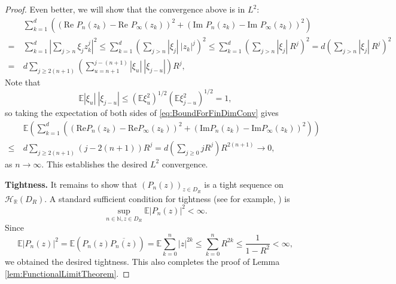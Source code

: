 \documentclass[12pt, reqno]{amsart}
\theoremstyle{plain}
\theoremstyle{definition}
\newcommand\E{{\mathbb{E}}}
\begin{document}
\begin{proof}
    Even better, we will show that the convergence above is in $L^2$:
    \begin{align}
        &\ \sum_{k=1}^d \left((\text{Re } P_n(z_k) - \text{Re } P_{\infty}(z_k))^2 + (\text{Im } P_n(z_k) - \text{Im } P_{\infty}(z_k))^2\right) \nonumber \\
        = & \ \sum_{k=1}^d  \left| \sum_{j > n} \xi_j z_k^j \right|^2 \le \sum_{k = 1}^d \left( \sum_{j > n} |\xi_j| \ |z_k|^j \right)^2 \le \sum_{k = 1}^d \left( \sum_{j > n} |\xi_j| \ R^j \right)^2 = d \left( \sum_{j > n} |\xi_j| \ R^j \right)^2 \nonumber \\
        = & \ d\sum_{j \ge 2(n+1)} \left( \sum_{u = n+1}^{j - (n+1)} |\xi_u| \ |\xi_{j-u}| \right) R^j, \label{eq:BoundForFinDimConv}
    \end{align}
    Note that
    \begin{equation*}
        \E |\xi_u| \ |\xi_{j-u}| \le (\E \xi_u^2)^{1/2} (\E \xi_{j-u}^2)^{1/2} = 1,
    \end{equation*}
    so taking the expectation of both sides of \eqref{eq:BoundForFinDimConv} gives
    \begin{align*}
        &\ \E\left(\sum_{k=1}^d \left((\text{Re} P_n(z_k) - \text{Re} P_{\infty}(z_k))^2 + (\text{Im} P_n(z_k) - \text{Im} P_{\infty}(z_k))^2\right)\right) \\
        \le &\ d \sum_{j \ge 2(n+1)} (j - 2(n+1))R^j = d\left( \sum_{j \ge 0} j R^j\right) R^{2(n+1)} \longrightarrow 0,
    \end{align*}
    as $n \rightarrow \infty$. This establishes the desired $L^2$ convergence.
 
 
 \vspace{5mm}
 \textbf{Tightness.}   It remains to show that $(P_n(z))_{z \in D_{R}}$ is a tight sequence on $\mathcal{H}_{\mathbb{R}}(D_{R})$. A standard sufficient condition for tightness (see for example, \cite[Lemma 4.2]{KK14}) is  
 $$\sup_{n \in \mathbb{N}, z \in D_{R}} \E |P_n(z)|^2 < \infty.$$ 
 Since
    \begin{equation*}
        \E|P_n(z)|^2 = \E(P_n(z) \overline{P_n(z)}) = \E\sum_{k = 0}^{n} |z|^{2k} \le \sum_{k = 0}^{n} R^{2k} \le \dfrac{1}{1 - R^2} < \infty,
    \end{equation*}
    we obtained the desired tightness. This also completes the proof of Lemma \ref{lem:FunctionalLimitTheorem}.
\end{proof}
\end{document}

